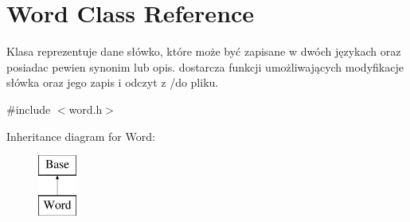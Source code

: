 \hypertarget{class_word}{}\section{Word Class Reference}
\label{class_word}


Klasa reprezentuje dane słówko, które może być zapisane w dwóch językach oraz posiadac pewien synonim lub opis. dostarcza funkcji umożliwających modyfikacje słówka oraz jego zapis i odczyt z /do pliku.  




{\ttfamily \#include $<$word.\+h$>$}

Inheritance diagram for Word\+:\begin{figure}[H]
\begin{center}
\leavevmode
\includegraphics[height=2.000000cm]{class_word}
\end{center}
\end{figure}
